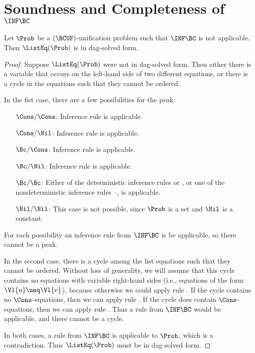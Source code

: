 \section{Soundness and Completeness of $\INF\BC$}

\begin{Lemma}\label{lemma:infl-dag-solved}
    Let $\Prob$ be a $(\BCUF)$-unification problem such that $\INF\BC$ is
    not applicable. Then $\ListEq(\Prob)$ is in dag-solved form.
\end{Lemma}

\begin{proof}
    Suppose $\ListEq(\Prob)$ were not in dag-solved form. Then either there
    is a variable that occurs on the left-hand side of two different equations,
    or there is a cycle in the equations such that they cannot be ordered.

    In the fist case, there are a few possibilities for the peak:
    \begin{itemize}[align=left]
        \item[$\Cons/\Cons$:] Inference rule  is
            applicable.
        \item[$\Cons/\Nil$:] Inference rule  is
            applicable.
        \item[$\Bc/\Cons$:] Inference rule  is applicable.
        \item[$\Bc/\Nil$:] Inference rule  is applicable.
        \item[$\Bc/\Bc$:] Either of the deterministic inference rules
             or , or one of the
            nondeterministic inference rules
            --, is
            applicable.
        \item[$\Nil/\Nil$:] This case is not possible, since $\Prob$ is a set
            and $\Nil$ is a constant.
    \end{itemize}
    For each possibility an inference rule from $\INF\BC$ is be applicable, so
    there cannot be a peak.

    In the second case, there is a cycle among the list equations such that
    they cannot be ordered. Without loss of generality, we will assume that
    this cycle contains no equations with variable right-hand sides (i.e.,
    equations of the form $\Vl{u} \ueq \Vl{v}$), because otherwise we could
    apply rule . If the cycle contains no $\Cons$-equations,
    then we can apply rule . If the cycle does contain
    $\Cons$-equations, then we can apply rule . Thus a
    rule from $\INF\BC$ would be applicable, and there cannot be a cycle.

    In both cases, a rule from $\INF\BC$ is applicable to $\Prob$, which is
    a contradiction. Thus $\ListEq(\Prob)$ must be in dag-solved form.
\end{proof}

